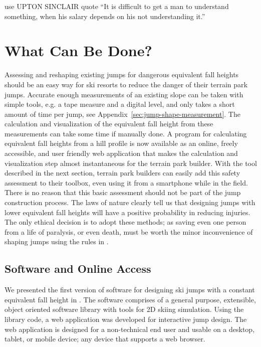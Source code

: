 \documentclass[smallextended]{svjour3}       %
\begin{document}
use UPTON SINCLAIR quote \cite{Sinclair1994}
“It is difficult to get a man to understand something, when his salary depends on his not understanding it.”

\section{What Can Be Done?}
\label{sec:action}
%
Assessing and reshaping existing jumps for dangerous equivalent fall heights
should be an easy way for ski resorts to reduce the danger of their terrain
park jumps. Accurate enough measurements of an existing slope can be taken with
simple tools, e.g. a tape measure and a digital level, and only takes a short
amount of time per jump, see Appendix~\ref{sec:jump-shape-measurement}.  The
calculation and visualization of the equivalent fall height from these
measurements can take some time if manually done. A program for calculating
equivalent fall heights from a hill profile is now available as an online,
freely accessible, and user friendly web application that makes the calculation
and visualization step almost instantaneous for the terrain park builder. With
the tool described in the next section, terrain park builders can easily add
this safety assessment to their toolbox, even using it from a smartphone while
in the field. There is no reason that this basic assessment should not be part
of the jump construction process. The laws of nature clearly tell us that
designing jumps with lower equivalent fall heights will have a positive
probability in reducing injuries. The only ethical decision is to adopt these
methods; as saving even one person from a life of paralysis, or even death,
must be worth the minor inconvenience of shaping jumps using the rules in
\cite{Levy2015}.


\subsection{Software and Online Access}
\label{sec:software}
%
We presented the first version of software for designing ski jumps with a
constant equivalent fall height in \cite{Moore2018}. The software comprises of
a general purpose, extensible, object oriented software library with tools for
2D skiing simulation. Using the library code, a web application was developed
for interactive jump design. The web application is designed for a
non-technical end user and usable on a desktop, tablet, or mobile device; any
device that supports a web browser.
\end{document}
